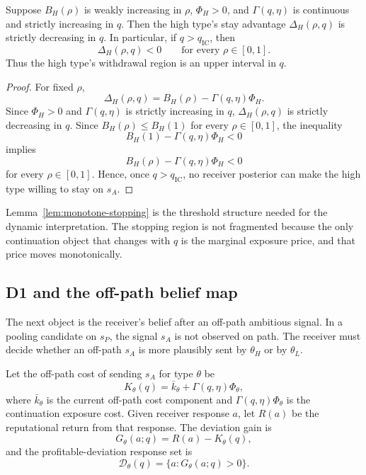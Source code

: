 \begin{lemma}
\label{lem:monotone-stopping}
Suppose \(B_H(\rho)\) is weakly increasing in \(\rho\), \(\Phi_H>0\), and \(\Gamma(q,\eta)\) is continuous and strictly increasing in \(q\). Then the high type's stay advantage \(\Delta_H(\rho,q)\) is strictly decreasing in \(q\). In particular, if \(q>q_{\mathrm{IC}}\), then
\[
\Delta_H(\rho,q)<0
\qquad\text{for every }\rho\in[0,1].
\]
Thus the high type's withdrawal region is an upper interval in \(q\).
\end{lemma}

\begin{proof}
For fixed \(\rho\),
\[
\Delta_H(\rho,q)=B_H(\rho)-\Gamma(q,\eta)\Phi_H.
\]
Since \(\Phi_H>0\) and \(\Gamma(q,\eta)\) is strictly increasing in \(q\), \(\Delta_H(\rho,q)\) is strictly decreasing in \(q\). Since \(B_H(\rho)\le B_H(1)\) for every \(\rho\in[0,1]\), the inequality
\[
B_H(1)-\Gamma(q,\eta)\Phi_H<0
\]
implies
\[
B_H(\rho)-\Gamma(q,\eta)\Phi_H<0
\]
for every \(\rho\in[0,1]\). Hence, once \(q>q_{\mathrm{IC}}\), no receiver posterior can make the high type willing to stay on \(s_A\).
\end{proof}

Lemma~\ref{lem:monotone-stopping} is the threshold structure needed for the dynamic interpretation. The stopping region is not fragmented because the only continuation object that changes with \(q\) is the marginal exposure price, and that price moves monotonically.

\subsection{D1 and the off-path belief map}
\label{subsec:off-path-belief-map}

The next object is the receiver's belief after an off-path ambitious signal. In a pooling candidate on \(s_P\), the signal \(s_A\) is not observed on path. The receiver must decide whether an off-path \(s_A\) is more plausibly sent by \(\theta_H\) or by \(\theta_L\).

Let the off-path cost of sending \(s_A\) for type \(\theta\) be
\[
K_\theta(q)=\bar k_\theta+\Gamma(q,\eta)\Phi_\theta,
\]
where \(\bar k_\theta\) is the current off-path cost component and \(\Gamma(q,\eta)\Phi_\theta\) is the continuation exposure cost. Given receiver response \(a\), let \(R(a)\) be the reputational return from that response. The deviation gain is
\[
G_\theta(a;q)=R(a)-K_\theta(q),
\]
and the profitable-deviation response set is
\[
\mathcal D_\theta(q)=\{a:G_\theta(a;q)>0\}.
\]

